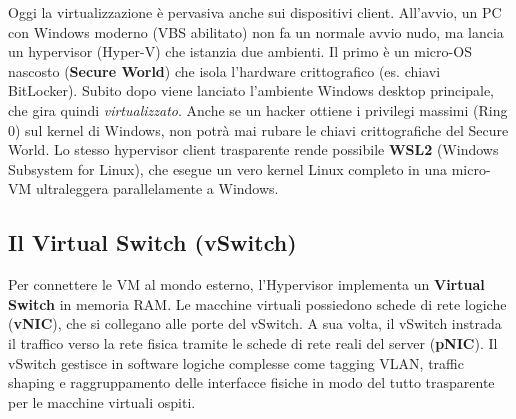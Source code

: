 \begin{tipbox}
Oggi la virtualizzazione è pervasiva anche sui dispositivi client. All'avvio, un PC con Windows moderno (VBS abilitato) non fa un normale avvio nudo, ma lancia un hypervisor (Hyper-V) che istanzia due ambienti. Il primo è un micro-OS nascosto (\textbf{Secure World}) che isola l'hardware crittografico (es. chiavi BitLocker). Subito dopo viene lanciato l'ambiente Windows desktop principale, che gira quindi \textit{virtualizzato}. Anche se un hacker ottiene i privilegi massimi (Ring 0) sul kernel di Windows, non potrà mai rubare le chiavi crittografiche del Secure World.
Lo stesso hypervisor client trasparente rende possibile \textbf{WSL2} (Windows Subsystem for Linux), che esegue un vero kernel Linux completo in una micro-VM ultraleggera parallelamente a Windows.
\end{tipbox}

\subsection{Il Virtual Switch (vSwitch)}
Per connettere le VM al mondo esterno, l'Hypervisor implementa un \textbf{Virtual Switch} in memoria RAM. Le macchine virtuali possiedono schede di rete logiche (\textbf{vNIC}), che si collegano alle porte del vSwitch. A sua volta, il vSwitch instrada il traffico verso la rete fisica tramite le schede di rete reali del server (\textbf{pNIC}). Il vSwitch gestisce in software logiche complesse come tagging VLAN, traffic shaping e raggruppamento delle interfacce fisiche in modo del tutto trasparente per le macchine virtuali ospiti.

